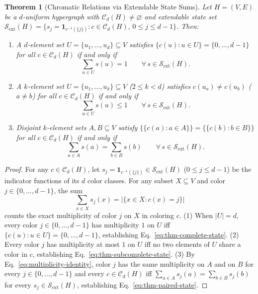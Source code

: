 \documentclass[aps,pra,reprint,superscriptaddress,longbibliography,nofootinbib,floatfix,10pt]{revtex4-2}
\newtheorem{theorem}{Theorem}
\theoremstyle{definition}\newtheorem{definition}[theorem]{Definition}
\theoremstyle{remark}\newtheorem{remark}[theorem]{Remark}
\newcommand{\Sc}{\mathcal S}\newcommand{\Cc}{\mathcal C}\newcommand{\Wc}{\mathcal W}
\begin{document}
\begin{theorem}[Chromatic Relations via Extendable State Sums]\label{thm:chromatic-conservation}
Let $H=(V,E)$ be a $d$-uniform hypergraph with $\Cc_d(H)\neq\varnothing$ and extendable state set $\Sc_{\mathrm{ext}}(H)=\{s_j=\mathbf{1}_{c^{-1}(\{j\})}:c\in\Cc_d(H),\,0\le j\le d-1\}$. Then:
\begin{enumerate}
\item A $d$-element set $U=\{u_1,\ldots,u_d\}\subseteq V$ satisfies $\{c(u):u\in U\}=\{0,\ldots,d-1\}$ for all $c\in\Cc_d(H)$ if and only if
\begin{equation}\label{eq:thm-complete-state}
\sum_{u\in U} s(u) = 1 \qquad \forall\, s\in\Sc_{\mathrm{ext}}(H).
\end{equation}
\item A $k$-element set $U=\{u_1,\ldots,u_k\}\subseteq V$ ($2\le k<d$) satisfies $c(u_a)\neq c(u_b)$ ($a\neq b$) for all $c\in\Cc_d(H)$ if and only if
\begin{equation}\label{eq:thm-subcomplete-state}
\sum_{u\in U} s(u) \le 1 \qquad \forall\, s\in\Sc_{\mathrm{ext}}(H).
\end{equation}
\item Disjoint $k$-element sets $A,B\subseteq V$ satisfy $\{\!\{c(a):a\in A\}\!\}=\{\!\{c(b):b\in B\}\!\}$ for all $c\in\Cc_d(H)$ if and only if
\begin{equation}\label{eq:thm-paired-state}
\sum_{a\in A} s(a) = \sum_{b\in B} s(b) \qquad \forall\, s\in\Sc_{\mathrm{ext}}(H).
\end{equation}
\end{enumerate}
\end{theorem}
\begin{proof}
For any $c\in\Cc_d(H)$, let $s_j=\mathbf{1}_{c^{-1}(\{j\})}\in\Sc_{\mathrm{ext}}(H)$ ($0\le j\le d-1$) be the indicator functions of its $d$ color classes. For any subset $X\subseteq V$ and color $j\in\{0,\ldots,d-1\}$, the sum
\begin{equation}\label{eq:multiplicity-identity}
\sum_{x\in X} s_j(x) = \bigl|\{x\in X: c(x)=j\}\bigr|
\end{equation}
counts the exact multiplicity of color $j$ on $X$ in coloring $c$.
(1) When $|U|=d$, every color $j\in\{0,\ldots,d-1\}$ has multiplicity $1$ on $U$ iff $\{c(u):u\in U\}=\{0,\ldots,d-1\}$, establishing Eq.~\eqref{eq:thm-complete-state}.
(2) Every color $j$ has multiplicity at most $1$ on $U$ iff no two elements of $U$ share a color in $c$, establishing Eq.~\eqref{eq:thm-subcomplete-state}.
(3) By Eq.~\eqref{eq:multiplicity-identity}, color $j$ has the same multiplicity on $A$ and on $B$ for every $j\in\{0,\ldots,d-1\}$ and every $c\in\Cc_d(H)$ iff $\sum_{a\in A}s_j(a)=\sum_{b\in B}s_j(b)$ for every $s_j\in\Sc_{\mathrm{ext}}(H)$, establishing Eq.~\eqref{eq:thm-paired-state}.
\end{proof}
\end{document}
